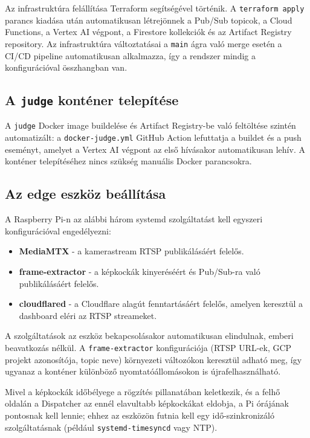 Az infrastruktúra felállítása Terraform segítségével történik. A \texttt{terraform apply} parancs kiadása után
automatikusan létrejönnek a Pub/Sub topicok, a Cloud Functions, a Vertex AI végpont, a Firestore kollekciók
és az Artifact Registry repository. Az infrastruktúra változtatásai a \texttt{main} ágra való merge esetén
a CI/CD pipeline automatikusan alkalmazza, így a rendszer mindig a konfigurációval összhangban van.

\subsection{A \texttt{judge} konténer telepítése}

A \texttt{judge} Docker image buildelése és Artifact Registry-be való feltöltése szintén automatizált:
a \texttt{docker-judge.yml} GitHub Action lefuttatja a buildet és a push eseményt, amelyet a Vertex AI végpont
az első hívásakor automatikusan lehív. A konténer telepítéséhez nincs szükség manuális Docker parancsokra.

\subsection{Az edge eszköz beállítása}

A Raspberry Pi-n az alábbi három systemd szolgáltatást kell egyszeri konfigurációval engedélyezni:

\begin{itemize}
    \item \textbf{MediaMTX} - a kamerastream RTSP publikálásáért felelős.
    \item \textbf{frame-extractor} - a képkockák kinyeréséért és Pub/Sub-ra való publikálásáért felelős.
    \item \textbf{cloudflared} - a Cloudflare alagút fenntartásáért felelős, amelyen keresztül a dashboard eléri az RTSP streameket.
\end{itemize}

A szolgáltatások az eszköz bekapcsolásakor automatikusan elindulnak, emberi beavatkozás nélkül.
A \texttt{frame-extractor} konfigurációja (RTSP URL-ek, GCP projekt azonosítója, topic neve) környezeti
változókon keresztül adható meg, így ugyanaz a konténer különböző nyomtatóállomásokon is újrafelhasználható.

Mivel a képkockák időbélyege a rögzítés pillanatában keletkezik, és a felhő oldalán a Dispatcher az ennél elavultabb
képkockákat eldobja, a Pi órájának pontosnak kell lennie; ehhez az eszközön futnia kell egy idő-szinkronizáló
szolgáltatásnak (például \texttt{systemd-timesyncd} vagy NTP).

